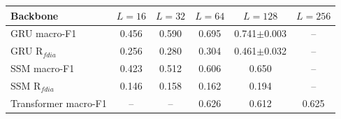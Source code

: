 \begin{tabular}{lccccc}
\toprule
Backbone & $L{=}16$ & $L{=}32$ & $L{=}64$ & $L{=}128$ & $L{=}256$ \\
\midrule
GRU macro-F1 & 0.456 & 0.590 & 0.695 & 0.741$\pm$0.003 & -- \\
GRU R$_{fdia}$ & 0.256 & 0.280 & 0.304 & 0.461$\pm$0.032 & -- \\
\midrule
SSM macro-F1 & 0.423 & 0.512 & 0.606 & 0.650 & -- \\
SSM R$_{fdia}$ & 0.146 & 0.158 & 0.162 & 0.194 & -- \\
\midrule
Transformer macro-F1 & -- & -- & 0.626 & 0.612 & 0.625 \\
\bottomrule
\end{tabular}
